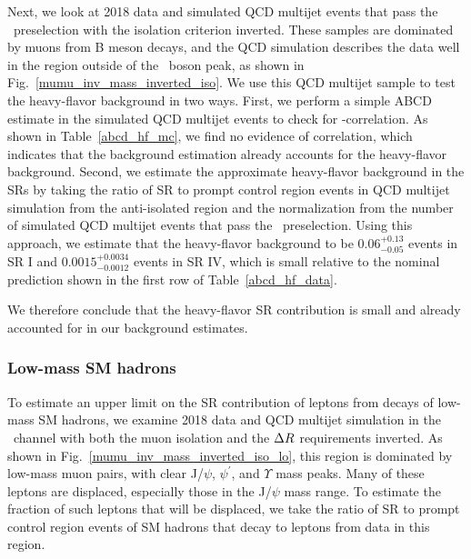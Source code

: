 Next, we look at 2018 data and simulated QCD multijet events that pass the \Pgm\Pgm\ preselection with the isolation criterion inverted. These samples are dominated by muons from B meson decays, and the QCD simulation describes the data well in the region outside of the \cPZ\ boson peak, as shown in Fig.~\ref{mumu_inv_mass_inverted_iso}. We use this QCD multijet sample to test the heavy-flavor background in two ways. First, we perform a simple ABCD estimate in the simulated QCD multijet events to check for \ada-\adb correlation. As shown in Table~\ref{abcd_hf_mc}, we find no evidence of correlation, which indicates that the background estimation already accounts for the heavy-flavor background. Second, we estimate the approximate heavy-flavor background in the SRs by taking the ratio of SR to prompt control region events in QCD multijet simulation from the anti-isolated region and the normalization from the number of simulated QCD multijet events that pass the \Pgm\Pgm\ preselection. Using this approach, we estimate that the heavy-flavor background to be $0.06^{+0.13}_{-0.05}$ events in SR I and $0.0015^{+0.0034}_{-0.0012}$ events in SR IV, which is small relative to the nominal prediction shown in the first row of Table~\ref{abcd_hf_data}.




We therefore conclude that the heavy-flavor SR contribution is small and already accounted for in our background estimates.

\subsubsection{Low-mass SM hadrons}
To estimate an upper limit on the SR contribution of leptons from decays of low-mass SM hadrons, we examine 2018 data and QCD multijet simulation in the \Pgm\Pgm\ channel with both the muon isolation and the $\Delta R$ requirements inverted. As shown in Fig.~\ref{mumu_inv_mass_inverted_iso_lo}, this region is dominated by low-mass muon pairs, with clear J/$\psi$, $\psi^\prime$, and $\Upsilon$ mass peaks. Many of these leptons are displaced, especially those in the J/$\psi$ mass range. To estimate the fraction of such leptons that will be displaced, we take the ratio of SR to prompt control region events of SM hadrons that decay to leptons from data in this region.



